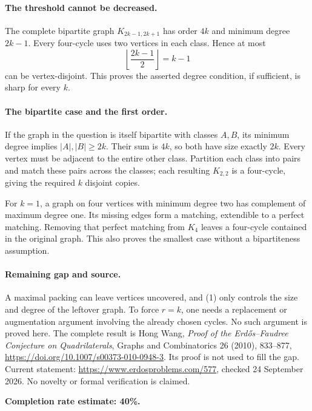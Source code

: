\paragraph{The threshold cannot be decreased.}
The complete bipartite graph \(K_{2k-1,2k+1}\) has order \(4k\) and minimum degree \(2k-1\). Every four-cycle uses two vertices in each class. Hence at most
\[
 \left\lfloor\frac{2k-1}{2}\right\rfloor=k-1
\]
can be vertex-disjoint. This proves the asserted degree condition, if sufficient, is sharp for every \(k\).

\paragraph{The bipartite case and the first order.}
If the graph in the question is itself bipartite with classes \(A,B\), its minimum degree implies \(|A|,|B|\geq2k\). Their sum is \(4k\), so both have size exactly \(2k\). Every vertex must be adjacent to the entire other class. Partition each class into pairs and match these pairs across the classes; each resulting \(K_{2,2}\) is a four-cycle, giving the required \(k\) disjoint copies.

For \(k=1\), a graph on four vertices with minimum degree two has complement of maximum degree one. Its missing edges form a matching, extendible to a perfect matching. Removing that perfect matching from \(K_4\) leaves a four-cycle contained in the original graph. This also proves the smallest case without a bipartiteness assumption.

\paragraph{Remaining gap and source.}
A maximal packing can leave vertices uncovered, and (1) only controls the size and degree of the leftover graph. To force \(r=k\), one needs a replacement or augmentation argument involving the already chosen cycles. No such argument is proved here. The complete result is Hong Wang, \emph{Proof of the Erd\H{o}s--Faudree Conjecture on Quadrilaterals}, Graphs and Combinatorics 26 (2010), 833--877, \url{https://doi.org/10.1007/s00373-010-0948-3}. Its proof is not used to fill the gap. Current statement: \url{https://www.erdosproblems.com/577}, checked 24 September 2026. No novelty or formal verification is claimed.

\textbf{Completion rate estimate: 40\%.}
